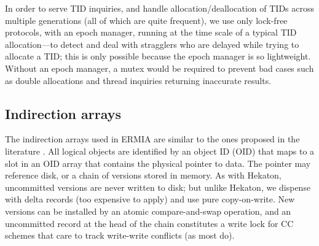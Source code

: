 In order to serve TID inquiries, and handle allocation/deallocation of TIDs across multiple generations (all of which are quite frequent), we use only lock-free protocols, with an epoch manager, running at the time scale of a typical TID allocation---to detect and deal with stragglers who are delayed while trying to allocate a TID; this is only possible because the epoch manager is so lightweight. Without an epoch manager, a mutex would be required to prevent bad cases such as double allocations and thread inquiries returning inaccurate results.


\subsection{Indirection arrays}
The indirection arrays used in ERMIA are similar to the ones proposed in the literature \cite{SadoghiRCB13,Diaconu+13}. All logical objects are identified by an object ID (OID) that maps to a slot in an OID array that contains the physical pointer to data. The pointer may reference disk, or a chain of versions stored in memory. As with Hekaton, uncommitted versions are never written to disk; but unlike Hekaton, we dispense with delta records (too expensive to apply) and use pure copy-on-write. New versions can be installed by an atomic compare-and-swap operation, and an uncommitted record at the head of the chain constitutes a write lock for CC schemes that care to track write-write conflicts (as most do). 

